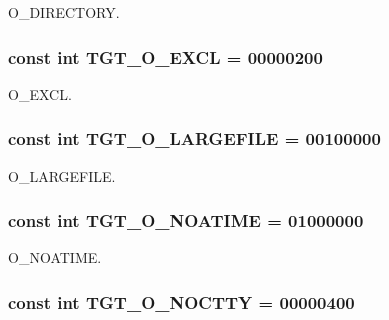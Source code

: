 O\_\-DIRECTORY. \hypertarget{classArmLinux64_a10d5d118d15b51ebdd4b16dc78342d1d}{
\subsubsection[{TGT\_\-O\_\-EXCL}]{\setlength{\rightskip}{0pt plus 5cm}const int {\bf TGT\_\-O\_\-EXCL} = 00000200}}
\label{classArmLinux64_a10d5d118d15b51ebdd4b16dc78342d1d}


O\_\-EXCL. \hypertarget{classArmLinux64_a9600e092a6309f94d92129ce5f85b945}{
\subsubsection[{TGT\_\-O\_\-LARGEFILE}]{\setlength{\rightskip}{0pt plus 5cm}const int {\bf TGT\_\-O\_\-LARGEFILE} = 00100000}}
\label{classArmLinux64_a9600e092a6309f94d92129ce5f85b945}


O\_\-LARGEFILE. \hypertarget{classArmLinux64_a0ee8b0c23c2babc48e978e872b03c82c}{
\subsubsection[{TGT\_\-O\_\-NOATIME}]{\setlength{\rightskip}{0pt plus 5cm}const int {\bf TGT\_\-O\_\-NOATIME} = 01000000}}
\label{classArmLinux64_a0ee8b0c23c2babc48e978e872b03c82c}


O\_\-NOATIME. \hypertarget{classArmLinux64_adfd4240281579e5f60c5e22c601225d8}{
\subsubsection[{TGT\_\-O\_\-NOCTTY}]{\setlength{\rightskip}{0pt plus 5cm}const int {\bf TGT\_\-O\_\-NOCTTY} = 00000400}}
\label{classArmLinux64_adfd4240281579e5f60c5e22c601225d8}


